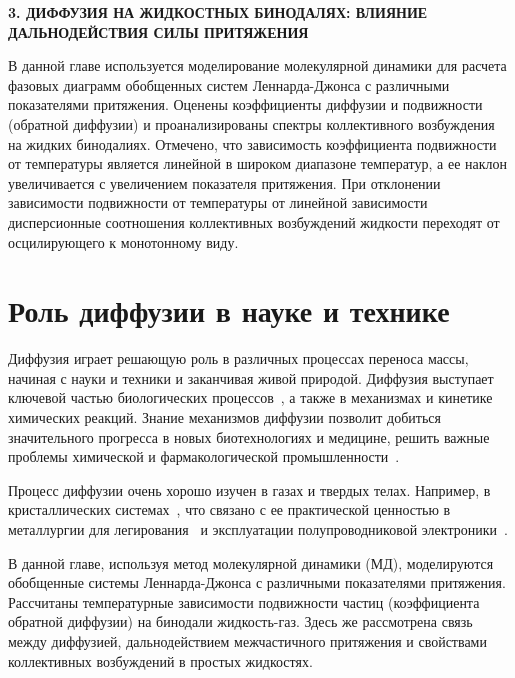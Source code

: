 
\begin{center}
\textbf{\large 3. ДИФФУЗИЯ НА ЖИДКОСТНЫХ БИНОДАЛЯХ: ВЛИЯНИЕ ДАЛЬНОДЕЙСТВИЯ СИЛЫ ПРИТЯЖЕНИЯ}
\end{center}


В данной главе используется моделирование молекулярной динамики для расчета фазовых диаграмм обобщенных систем Леннарда-Джонса с различными показателями притяжения.
Оценены коэффициенты диффузии и подвижности (обратной диффузии) и проанализированы спектры коллективного возбуждения на жидких бинодалиях. 
Отмечено, что зависимость коэффициента подвижности от температуры является линейной в широком диапазоне температур, а ее наклон увеличивается с увеличением показателя притяжения.
При отклонении зависимости подвижности от температуры от линейной зависимости дисперсионные соотношения коллективных возбуждений жидкости переходят от осцилирующего к монотонному виду.

\section{Роль диффузии в науке и технике}
\label{MACR-SecIntroduction}

Диффузия играет решающую роль в различных процессах переноса массы, начиная с науки и техники и заканчивая живой природой.
Диффузия выступает ключевой частью биологических процессов~\cite{10.1016/j.bbagen.2013.09.037, 10.1038/s41598-018-22643-9}, а также в механизмах и кинетике химических реакций. 
Знание механизмов диффузии позволит добиться значительного прогресса в новых биотехнологиях и медицине, решить важные проблемы химической и фармакологической промышленности~\cite{10.1002/3527602836}.

Процесс диффузии очень хорошо изучен в газах и твердых телах.
Например, в кристаллических системах~\cite{10.1016/0079-6816(95)00039-2}, что связано с ее практической ценностью в металлургии для легирования~\cite{10.1016/s0924-0136(96)02826-9, 10.1016/j.actamat.2015.10.010, 10.1134/s1063783411110308} и эксплуатации полупроводниковой электроники~\cite{10.1103/physrevlett.84.4220, 10.1016/j.physrep.2009.10.003}.

В данной главе, используя метод молекулярной динамики (МД), моделируются обобщенные системы Леннарда-Джонса с различными показателями притяжения.
Рассчитаны температурные зависимости подвижности частиц (коэффициента обратной диффузии) на бинодали жидкость-газ. 
Здесь же рассмотрена связь между диффузией, дальнодействием межчастичного притяжения и свойствами коллективных возбуждений в простых жидкостях.

